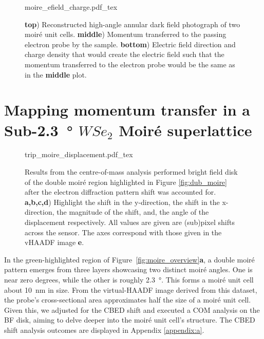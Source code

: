 \begin{figure}
    \centering
    \def\svgwidth{.5\linewidth}
    {moire_efield_charge.pdf_tex}
    \caption{\textbf{top}) Reconstructed high-angle annular dark field photograph of two moiré unit cells. \textbf{middle}) Momentum transferred to the passing electron probe by the sample. \textbf{bottom}) Electric field direction and charge density that would create the electric field such that the momentum transferred to the electron probe would be the same as in the \textbf{middle} plot.}
    \label{fig:m_mom}
\end{figure}

\section{Mapping momentum transfer in a Sub-\SI{2.3}{\degree} $WSe_2$ Moiré superlattice}
\label{sec:large_moire}
\begin{figure}
    \centering
    \def\svgwidth{.95\linewidth}
    {trip_moire_displacement.pdf_tex}
    \caption{Results from the centre-of-mass analysis performed bright field disk of the double moiré region highlighted in Figure \ref{fig:dub_moire} after the electron diffraction pattern shift was accounted for. \textbf{a,b,c,d}) Highlight the shift in the y-direction, the shift in the x-direction, the magnitude of the shift, and, the angle of the displacement respectively. All values are given are (sub)pixel shifts across the sensor. The axes correspond with those given in the vHAADF image \textbf{e}.}
    \label{fig:trip_m_dis}
\end{figure}

In the green-highlighted region of Figure~\ref{fig:moire_overview}\textbf{a}, a double moiré pattern emerges from three layers showcasing two distinct moiré angles.
%
One is near zero degrees, while the other is roughly \SI{2.3}{\degree}.
%
This forms a moiré unit cell about \SI{10}{\nano\meter} in size. 
%
From the virtual-HAADF image derived from this dataset, the probe's cross-sectional area approximates half the size of a moiré unit cell. 
%
Given this, we adjusted for the CBED shift and executed a COM analysis on the BF disk, aiming to delve deeper into the moiré unit cell's structure. 
%
The CBED shift analysis outcomes are displayed in Appendix \ref{appendix:a}.

